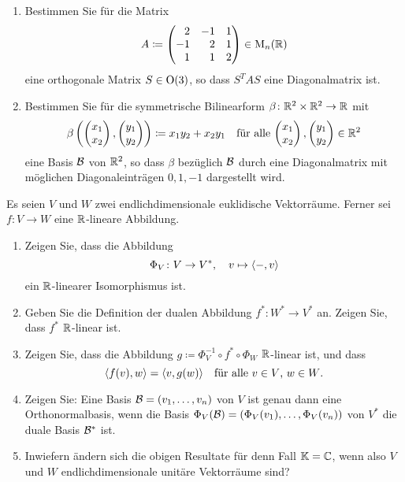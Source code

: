 \documentclass[a4paper,10pt]{scrartcl}
\begin{document}
\begin{question}
  \begin{enumerate}[leftmargin=*]
    \item
      Bestimmen Sie für die Matrix
      \[
        A \coloneqq
        \begin{pmatrix*}[r]
          2  & -1  & 1 \\
          -1  &  2  & 1 \\
          1  &  1  & 2
        \end{pmatrix*}
        \in \Mat_n(\Rbb)
      \]
      eine orthogonale Matrix $S \in \operatorname{O}(3)$, so dass $S^T A S$ eine Diagonalmatrix ist.
    \item
      Bestimmen Sie für die symmetrische Bilinearform $\beta \colon \mathbb{R}^2 \times \mathbb{R}^2 \to \mathbb{R}$ mit
      \[
        \beta\left( \begin{pmatrix} x_1 \\ x_2 \end{pmatrix}, \begin{pmatrix} y_1 \\ y_2 \end{pmatrix} \right)
        \coloneqq
        x_1 y_2 + x_2 y_1
        \quad
        \text{für alle $\begin{pmatrix} x_1 \\ x_2 \end{pmatrix}, \begin{pmatrix} y_1 \\ y_2 \end{pmatrix} \in \mathbb{R}^2$}
      \]
      eine Basis $\mathcal{B}$ von $\mathbb{R}^2$, so dass $\beta$ bezüglich $\mathcal{B}$ durch eine Diagonalmatrix mit möglichen Diagonaleinträgen $0, 1, -1$ dargestellt wird.
  \end{enumerate}
\end{question}


\begin{question}
  Es seien $V$ und $W$ zwei endlichdimensionale euklidische Vektorräume.
  Ferner sei $f \colon V \to W$ eine $\mathbb{R}$-lineare Abbildung.
  \begin{enumerate}[leftmargin=*]
    \item
      Zeigen Sie, dass die Abbildung
      \[
        \Phi_V \colon V \to V^*,
        \quad
        v \mapsto \langle -, v \rangle
      \]
      ein $\mathbb{R}$-linearer Isomorphismus ist.
    \item
      Geben Sie die Definition der dualen Abbildung $f^* \colon W^* \to V^*$ an.
      Zeigen Sie, dass $f^*$ $\mathbb{R}$-linear ist.
    \item
      Zeigen Sie, dass die Abbildung $g \coloneqq \Phi_V^{-1} \circ f^* \circ \Phi_W$ $\mathbb{R}$-linear ist, und dass
      \[
        \langle f(v), w \rangle = \langle v, g(w) \rangle
        \quad
        \text{für alle $v \in V$, $w \in W$}.
      \]
    \item
      Zeigen Sie:
      Eine Basis $\mathcal{B} = (v_1, \dotsc, v_n)$ von $V$ ist genau dann eine Orthonormalbasis, wenn die Basis $\Phi_V(\mathcal{B}) = (\Phi_V(v_1), \dotsc, \Phi_V(v_n))$ von $V^*$ die duale Basis $\mathcal{B}^*$ ist.
    \item
      Inwiefern ändern sich die obigen Resultate für denn Fall $\mathbb{K} = \mathbb{C}$, wenn also $V$ und $W$ endlichdimensionale unitäre Vektorräume sind?
  \end{enumerate}
\end{question}
\end{document}
